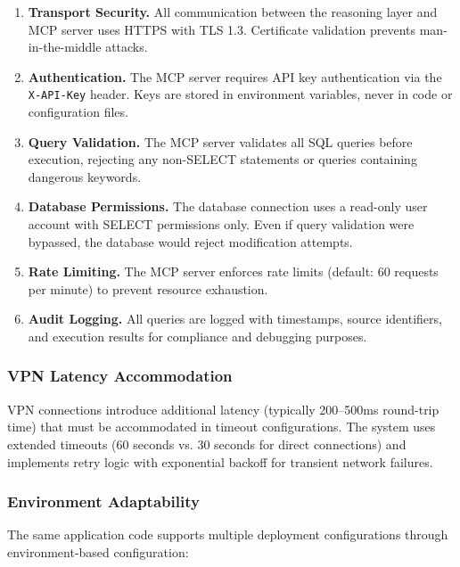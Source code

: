 \begin{enumerate}
    \item \textbf{Transport Security.} All communication between the reasoning layer and MCP server uses HTTPS with TLS 1.3. Certificate validation prevents man-in-the-middle attacks.

    \item \textbf{Authentication.} The MCP server requires API key authentication via the \texttt{X-API-Key} header. Keys are stored in environment variables, never in code or configuration files.

    \item \textbf{Query Validation.} The MCP server validates all SQL queries before execution, rejecting any non-SELECT statements or queries containing dangerous keywords.

    \item \textbf{Database Permissions.} The database connection uses a read-only user account with SELECT permissions only. Even if query validation were bypassed, the database would reject modification attempts.

    \item \textbf{Rate Limiting.} The MCP server enforces rate limits (default: 60 requests per minute) to prevent resource exhaustion.

    \item \textbf{Audit Logging.} All queries are logged with timestamps, source identifiers, and execution results for compliance and debugging purposes.
\end{enumerate}

\subsubsection{VPN Latency Accommodation}

VPN connections introduce additional latency (typically 200--500ms round-trip time) that must be accommodated in timeout configurations. The system uses extended timeouts (60 seconds vs. 30 seconds for direct connections) and implements retry logic with exponential backoff for transient network failures.

\subsubsection{Environment Adaptability}

The same application code supports multiple deployment configurations through environment-based configuration:

